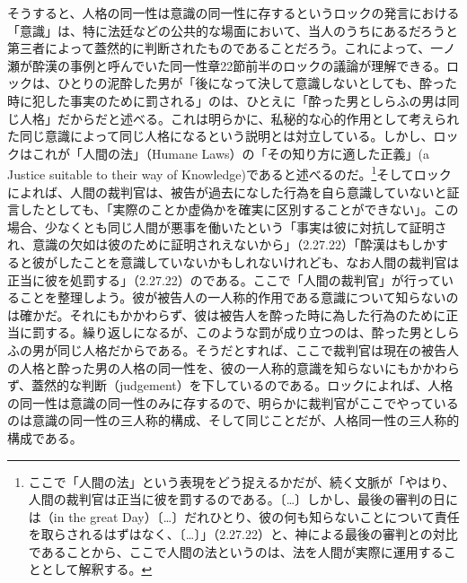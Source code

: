 \documentclass[a4j,oneside]{jsbook}
\begin{document}
\par
そうすると、人格の同一性は意識の同一性に存するというロックの発言における「意識」は、特に法廷などの公共的な場面において、当人のうちにあるだろうと第三者によって蓋然的に判断されたものであることだろう。これによって、一ノ瀬が酔漢の事例と呼んでいた同一性章22節前半のロックの議論が理解できる。ロックは、ひとりの泥酔した男が「後になって決して意識しないとしても、酔った時に犯した事実のために罰される」のは、ひとえに「酔った男としらふの男は同じ人格」だからだと述べる。これは明らかに、私秘的な心的作用として考えられた同じ意識によって同じ人格になるという説明とは対立している。しかし、ロックはこれが「人間の法」（Humane Laws）の「その知り方に適した正義」(a Justice suitable to their way of Knowledge)であると述べるのだ。\footnote{ここで「人間の法」という表現をどう捉えるかだが、続く文脈が「やはり、人間の裁判官は正当に彼を罰するのである。〔…〕しかし、最後の審判の日には（in the great Day）〔…〕だれひとり、彼の何も知らないことについて責任を取らされるはずはなく、〔…〕」（2.27.22）と、神による最後の審判との対比であることから、ここで人間の法というのは、法を人間が実際に運用することとして解釈する。}そしてロックによれば、人間の裁判官は、被告が過去になした行為を自ら意識していないと証言したとしても、「実際のことか虚偽かを確実に区別することができない」。この場合、少なくとも同じ人間が悪事を働いたという「事実は彼に対抗して証明され、意識の欠如は彼のために証明されえないから」（2.27.22）「酔漢はもしかすると彼がしたことを意識していないかもしれないけれども、なお人間の裁判官は正当に彼を処罰する」（2.27.22）のである。ここで「人間の裁判官」が行っていることを整理しよう。彼が被告人の一人称的作用である意識について知らないのは確かだ。それにもかかわらず、彼は被告人を酔った時に為した行為のために正当に罰する。繰り返しになるが、このような罰が成り立つのは、酔った男としらふの男が同じ人格だからである。そうだとすれば、ここで裁判官は現在の被告人の人格と酔った男の人格の同一性を、彼の一人称的意識を知らないにもかかわらず、蓋然的な判断（judgement）を下しているのである。ロックによれば、人格の同一性は意識の同一性のみに存するので、明らかに裁判官がここでやっているのは意識の同一性の三人称的構成、そして同じことだが、人格同一性の三人称的構成である。
\par
\end{document}
